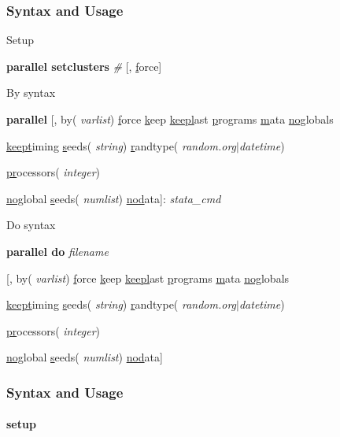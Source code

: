 \documentclass[11pt, handout]{beamer}
\begin{document}
\begin{frame}
\frametitle{Syntax and Usage}

Setup

\begin{semiverbatim}
\footnotesize
{\bf parallel setclusters} {\it \#}  [, \uline{f}orce] 
\end{semiverbatim}\pause

By syntax

\begin{semiverbatim}
\footnotesize
{\bf parallel} [, by({\it \color{blue} varlist}) \uline{f}orce \uline{k}eep \uline{keepl}ast \uline{p}rograms \uline{m}ata \uline{nog}lobals 

\hspace{1cm} \uline{keept}iming \uline{s}eeds({\it \color{blue} string}) \uline{r}andtype({\it \color{blue} random.org$|$datetime})

\hspace{1cm} \uline{pr}ocessors({\it \color{blue} integer})

\hspace{1cm} \uline{nog}lobal \uline{s}eeds({\it \color{blue} numlist}) \uline{nod}ata]:  {\it stata\_cmd}
\end{semiverbatim}\pause

Do syntax

\begin{semiverbatim}
\footnotesize
{\bf parallel do} {\it \color{blue} filename}

\hspace{1cm} [, by({\it \color{blue} varlist}) \uline{f}orce \uline{k}eep \uline{keepl}ast \uline{p}rograms \uline{m}ata \uline{nog}lobals 

\hspace{1cm} \uline{keept}iming \uline{s}eeds({\it \color{blue} string}) \uline{r}andtype({\it \color{blue} random.org$|$datetime})

\hspace{1cm} \uline{pr}ocessors({\it \color{blue} integer})

\hspace{1cm} \uline{nog}lobal \uline{s}eeds({\it \color{blue} numlist}) \uline{nod}ata] 
\end{semiverbatim}

\end{frame}


\begin{frame}
\frametitle{Syntax and Usage}\framesubtitle{setup}

\end{frame}
\end{document}

